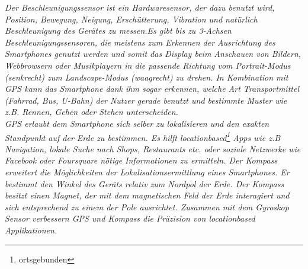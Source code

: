  \textit{Der Beschleunigungssensor ist ein Hardwaresensor, der dazu benutzt wird, Position, Bewegung, Neigung, Erschütterung, Vibration und natürlich Beschleunigung des Gerätes zu messen.Es gibt bis zu 3-Achsen Beschleunigungssensoren, die meistens zum Erkennen der Ausrichtung des \glspl{Smartphone} genutzt werden und somit das Display beim Anschauen von Bildern, Webbrowsern oder Musikplayern in die passende Richtung vom Portrait-Modus (senkrecht) zum Landscape-Modus (waagrecht) zu drehen. In Kombination mit \gls{GPS} kann das \gls{Smartphone} dank ihm sogar erkennen, welche Art Transportmittel (Fahrrad, Bus, U-Bahn) der Nutzer gerade benutzt und bestimmte Muster wie z.B. Rennen, Gehen oder Stehen unterscheiden.\\
\gls{GPS} erlaubt dem \gls{Smartphone} sich selber zu lokalisieren und den exakten Standpunkt auf der Erde zu bestimmen. Es hilft locationbased\footnote{ ortsgebunden} \Glspl{App} wie z.B Navigation, lokale Suche nach Shops, Restaurants etc. oder soziale Netzwerke wie Facebook oder Foursquare nötige Informationen zu ermitteln. Der Kompass erweitert die Möglichkeiten der Lokalisationsermittlung eines \gls{Smartphone}s. Er bestimmt den Winkel des Geräts relativ zum Nordpol der Erde. Der Kompass besitzt einen Magnet, der mit dem magnetischen Feld der Erde interagiert und sich entsprechend zu einem der Pole ausrichtet. Zusammen mit dem Gyroskop Sensor verbessern \gls{GPS} und Kompass die Präzision von locationbased Applikationen.}

